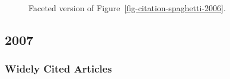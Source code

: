 \documentclass[
  10pt,
  letterpaper,
  DIV=11,
  numbers=noendperiod,
  twoside]{scrartcl}
\begin{document}
\begin{figure}


\caption{\label{fig-citation-facet-2006}Faceted version of
Figure~\ref{fig-citation-spaghetti-2006}.}

\end{figure}%

\newpage

\subsection{2007}\label{sec-s2007}

\subsubsection*{Widely Cited Articles}\label{widely-cited-articles-51}
\end{document}
